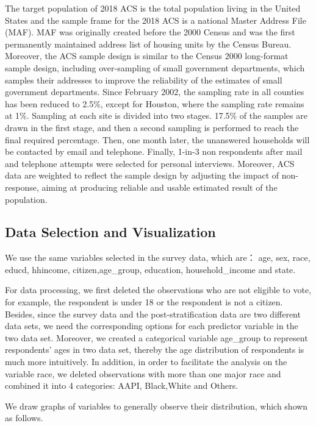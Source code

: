 \documentclass[
]{article}
\begin{document}
The target population of 2018 ACS is the total population living in the
United States and the sample frame for the 2018 ACS is a national Master
Address File (MAF). MAF was originally created before the 2000 Census
and was the first permanently maintained address list of housing units
by the Census Bureau. Moreover, the ACS sample design is similar to the
Census 2000 long-format sample design, including over-sampling of small
government departments, which samples their addresses to improve the
reliability of the estimates of small government departments. Since
February 2002, the sampling rate in all counties has been reduced to
2.5\%, except for Houston, where the sampling rate remains at 1\%.
Sampling at each site is divided into two stages. 17.5\% of the samples
are drawn in the first stage, and then a second sampling is performed to
reach the final required percentage. Then, one month later, the
unanswered households will be contacted by email and telephone. Finally,
1-in-3 non respondents after mail and telephone attempts were selected
for personal interviews. Moreover, ACS data are weighted to reflect the
sample design by adjusting the impact of non-response, aiming at
producing reliable and usable estimated result of the population.

\hypertarget{data-selection-and-visualization-1}{%
\subsection{Data Selection and
Visualization}\label{data-selection-and-visualization-1}}

We use the same variables selected in the survey data, which are： age,
sex, race, educd, hhincome, citizen,age\_group, education,
household\_income and state.

For data processing, we first deleted the observations who are not
eligible to vote, for example, the respondent is under 18 or the
respondent is not a citizen. Besides, since the survey data and the
post-stratification data are two different data sets, we need the
corresponding options for each predictor variable in the two data set.
Moreover, we created a categorical variable age\_group to represent
respondents' ages in two data set, thereby the age distribution of
respondents is much more intuitively. In addition, in order to
facilitate the analysis on the variable race, we deleted observations
with more than one major race and combined it into 4 categories: AAPI,
Black,White and Others.

We draw graphs of variables to generally observe their distribution,
which shown as follows.
\end{document}
